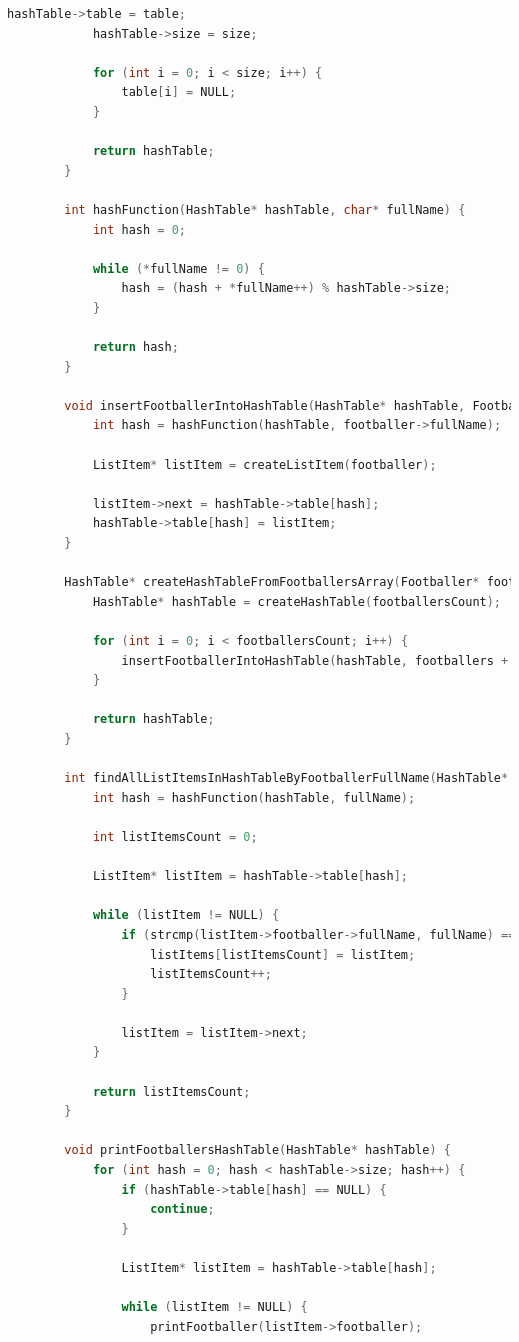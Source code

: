 \documentclass[12pt]{article}
\begin{document}
\begin{lstlisting}[language=C]
			hashTable->table = table;
			hashTable->size = size;
			
			for (int i = 0; i < size; i++) {
				table[i] = NULL;
			}
			
			return hashTable;
		}
		
		int hashFunction(HashTable* hashTable, char* fullName) {
			int hash = 0;
			
			while (*fullName != 0) {
				hash = (hash + *fullName++) % hashTable->size;
			}
			
			return hash;
		}
		
		void insertFootballerIntoHashTable(HashTable* hashTable, Footballer* footballer) {
			int hash = hashFunction(hashTable, footballer->fullName);
			
			ListItem* listItem = createListItem(footballer);
			
			listItem->next = hashTable->table[hash];
			hashTable->table[hash] = listItem;
		}
		
		HashTable* createHashTableFromFootballersArray(Footballer* footballers, int footballersCount) {
			HashTable* hashTable = createHashTable(footballersCount);
			
			for (int i = 0; i < footballersCount; i++) {
				insertFootballerIntoHashTable(hashTable, footballers + i);
			}
			
			return hashTable;
		}
		
		int findAllListItemsInHashTableByFootballerFullName(HashTable* hashTable, char* fullName, ListItem** listItems) {
			int hash = hashFunction(hashTable, fullName);
			
			int listItemsCount = 0;
			
			ListItem* listItem = hashTable->table[hash];
			
			while (listItem != NULL) {
				if (strcmp(listItem->footballer->fullName, fullName) == 0) {
					listItems[listItemsCount] = listItem;
					listItemsCount++;
				}
				
				listItem = listItem->next;
			}
			
			return listItemsCount;
		}
		
		void printFootballersHashTable(HashTable* hashTable) {
			for (int hash = 0; hash < hashTable->size; hash++) {
				if (hashTable->table[hash] == NULL) {
					continue;
				}
				
				ListItem* listItem = hashTable->table[hash];
				
				while (listItem != NULL) {
					printFootballer(listItem->footballer);
					

\end{lstlisting}
\end{document}
